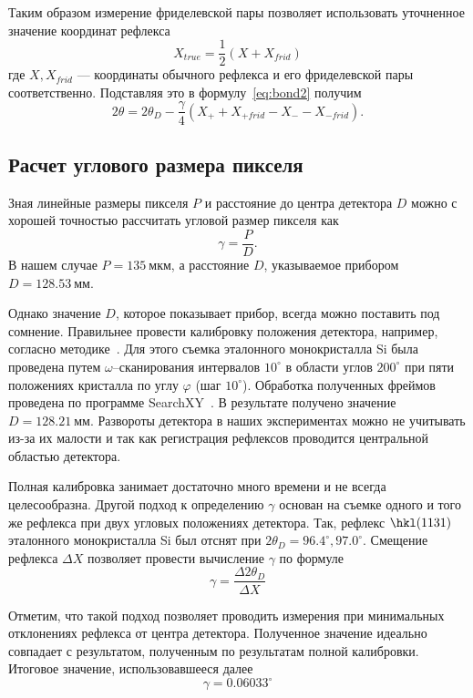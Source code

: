 \documentclass[a4paper,14pt]{extarticle}
\newcommand{\unit}[1]{ \ \text{#1}}
\newcommand{\degree}{^\circ}
\newcounter{x}
\begin{document}
Таким образом измерение фриделевской пары позволяет использовать уточненное значение координат рефлекса
\[X_{true} = \frac{1}{2}(X + X_{frid})\]
где $X, X_{frid}$ --- координаты обычного рефлекса и его фриделевской пары соответственно.
Подставляя это в формулу~\ref{eq:bond2} получим
\begin{equation} \label{eq:bond4}
    2\theta = 2\theta_D - \frac{\gamma}{4} (X_{+} + X_{+frid} - X_{-} - X_{-frid}).
\end{equation}
\subsection{Расчет углового размера пикселя}
Зная линейные размеры пикселя $P$ и расстояние до центра детектора $D$ можно с хорошей точностью рассчитать угловой размер пикселя как
\begin{equation} \label{eq:gamma_simple}
    \gamma = \frac{P}{D}.
\end{equation}
В нашем случае $P = 135\unit{мкм}$, а расстояние $D$, указываемое прибором $D = 128.53\unit{мм}$.

Однако значение $D$, которое показывает прибор, всегда можно поставить под сомнение.
Правильнее провести калибровку положения детектора, например, согласно методике~\cite{Panchenko:2023}.
Для этого съемка эталонного монокристалла Si была проведена путем $\omega$--сканирования интервалов $10\degree$ в области углов $200\degree$ при пяти положениях кристалла по углу $\varphi$ (шаг $10\degree$).
Обработка полученных фреймов проведена по программе SearchXY~\cite{Panchenko:2023}.
В результате получено значение $D = 128.21\unit{мм}$.
Развороты детектора в наших экспериментах можно не учитывать из-за их малости и так как регистрация рефлексов проводится центральной областью детектора.

Полная калибровка занимает достаточно много времени и не всегда целесообразна.
Другой подход к определению $\gamma$ основан на съемке одного и того же рефлекса при двух угловых положениях детектора.
Так, рефлекс $\hkl(11 3 1)$ эталонного монокристалла Si был отснят при $2\theta_D = 96.4\degree, 97.0\degree$.
Смещение рефлекса $\Delta X$ позволяет провести вычисление $\gamma$ по формуле
\begin{equation} \label{eq:gamma_delta}
    \gamma = \frac{\Delta 2\theta_D}{\Delta X}
\end{equation}

Отметим, что такой подход позволяет проводить измерения при минимальных отклонениях рефлекса от центра детектора.
Полученное значение идеально совпадает с результатом, полученным по результатам полной калибровки.
Итоговое значение, использовавшееся далее
\[ \gamma = 0.06033\degree \]
\end{document}
